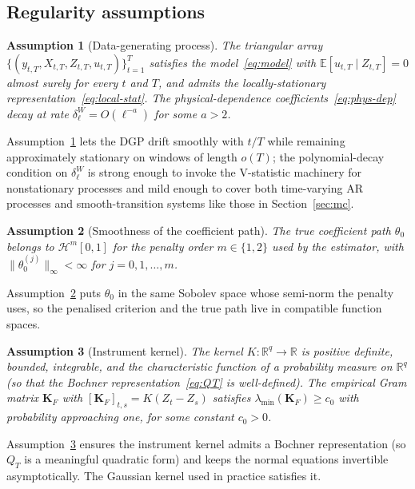 \documentclass[12pt]{article}
\newcommand{\R}{\mathbb{R}}
\newcommand{\E}{\mathbb{E}}
\newcommand{\calH}{\mathcal{H}}
\newcommand{\bfK}{\mathbf{K}}
\newtheorem{assumption}{Assumption}
\begin{document}
\subsection{Regularity assumptions}\label{sec:inference-assump}

\begin{assumption}[Data-generating process]\label{assum:dgp}
The triangular array $\{(y_{t,T}, X_{t,T}, Z_{t,T}, u_{t,T})\}_{t = 1}^T$ satisfies the model~\eqref{eq:model} with $\E[u_{t,T} \mid Z_{t,T}] = 0$ almost surely for every $t$ and $T$, and admits the locally-stationary representation~\eqref{eq:local-stat}. The physical-dependence coefficients~\eqref{eq:phys-dep} decay at rate $\delta_\ell^W = O(\ell^{-a})$ for some $a > 2$.
\end{assumption}
Assumption~\ref{assum:dgp} lets the DGP drift smoothly with $t/T$ while remaining approximately stationary on windows of length $o(T)$; the polynomial-decay condition on $\delta_\ell^W$ is strong enough to invoke the V-statistic machinery for nonstationary processes and mild enough to cover both time-varying AR processes and smooth-transition systems like those in Section~\ref{sec:mc}.

\begin{assumption}[Smoothness of the coefficient path]\label{assum:smooth}
The true coefficient path $\theta_0$ belongs to $\calH^m[0,1]$ for the penalty order $m \in \{1, 2\}$ used by the estimator, with $\|\theta_0^{(j)}\|_\infty < \infty$ for $j = 0, 1, \ldots, m$.
\end{assumption}
Assumption~\ref{assum:smooth} puts $\theta_0$ in the same Sobolev space whose semi-norm the penalty uses, so the penalised criterion and the true path live in compatible function spaces.

\begin{assumption}[Instrument kernel]\label{assum:kernel}
The kernel $K : \R^q \to \R$ is positive definite, bounded, integrable, and the characteristic function of a probability measure on $\R^q$ (so that the Bochner representation~\eqref{eq:QT} is well-defined). The empirical Gram matrix $\bfK_F$ with $[\bfK_F]_{t,s} = K(Z_t - Z_s)$ satisfies $\lambda_{\min}(\bfK_F) \geq c_0$ with probability approaching one, for some constant $c_0 > 0$.
\end{assumption}
Assumption~\ref{assum:kernel} ensures the instrument kernel admits a Bochner representation (so $Q_T$ is a meaningful quadratic form) and keeps the normal equations invertible asymptotically. The Gaussian kernel used in practice satisfies it.
\end{document}
